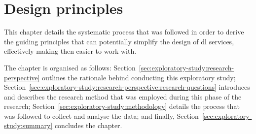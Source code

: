 \chapter{Design principles\label{ch:exploratory-study}}

This chapter details the systematic process that was followed in order to
derive the guiding principles that can potentially simplify the design of
\gls{dl} services, effectively making then easier to work with.

The chapter is organised as follows: Section~\ref{sec:exploratory-study:research-perspective} outlines the rationale behind
conducting this exploratory study;
Section~\ref{sec:exploratory-study:research-perspective:research-questions}
introduces and describes the research method that was employed during this phase
of the research; Section~\ref{sec:exploratory-study:methodology} details the
process that was followed to collect and analyse the data; and finally, Section~\ref{sec:exploratory-study:summary} concludes the chapter.





